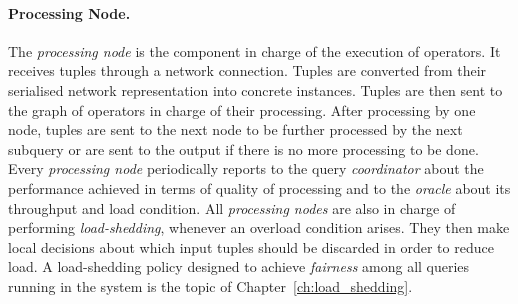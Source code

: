 \paragraph*{Processing Node.}
The \emph{processing node} is the component in charge of the execution of operators. It receives tuples through
a network connection. Tuples are converted from their serialised network representation into
concrete instances.
Tuples are then sent to the graph of operators in charge of their processing. After processing by one
node, tuples are sent to the next node to be further processed by the next subquery or are sent to the
output if there is no more processing to be done. Every \emph{processing node} periodically reports to the query \emph{coordinator} about the performance
achieved in terms of quality of processing and to the \emph{oracle} about its throughput and load
condition.
All \emph{processing nodes} are also in charge of performing \emph{load-shedding}, whenever an overload
condition arises. They then make local decisions about which input tuples should be discarded in order to
reduce load. A \mbox{load-shedding} policy designed to achieve \emph{fairness} among all queries running
in the system is the topic of Chapter~\ref{ch:load_shedding}.

% 

